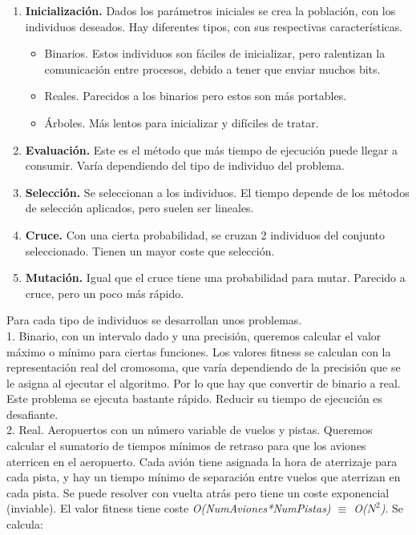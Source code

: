 	\begin{enumerate}
		\item \textbf{Inicialización.} Dados los parámetros iniciales se crea la población, con los individuos deseados. Hay diferentes tipos, con sus respectivas características.
		\begin{itemize}
			\item Binarios. Estos individuos son fáciles de inicializar, pero ralentizan la comunicación entre procesos, debido a tener que enviar muchos bits.
			\item Reales. Parecidos a los binarios pero estos son más portables.
			\item Árboles. Más lentos para inicializar y difíciles de tratar.
		\end{itemize}
		
		\item \textbf{Evaluación.} Este es el método que más tiempo de ejecución puede llegar a consumir. Varía dependiendo del tipo de individuo del problema.
		
		\item \textbf{Selección.} Se seleccionan a los individuos. El tiempo depende de los métodos de selección aplicados, pero suelen ser lineales.
		
		\item \textbf{Cruce.} Con una cierta probabilidad, se cruzan 2 individuos del conjunto seleccionado. Tienen un mayor coste que selección.
		
		\item \textbf{Mutación.} Igual que el cruce tiene una probabilidad para mutar. Parecido a cruce, pero un poco más rápido.
	\end{enumerate}
	
	Para cada tipo de individuos se desarrollan unos problemas.\\
	1. Binario, con un intervalo dado y una precisión, queremos calcular el valor máximo o mínimo para ciertas funciones. Los valores fitness se calculan con la representación real del cromosoma, que varía dependiendo de la precisión que se le asigna al ejecutar el algoritmo. Por lo que hay que convertir de binario a real.
	Este problema se ejecuta bastante rápido. Reducir su tiempo de ejecución es desafiante.\\
	2. Real. Aeropuertos con un número variable de vuelos y pistas. Queremos calcular el sumatorio de tiempos mínimos de retraso para que los aviones aterricen en el aeropuerto. Cada avión tiene asignada la hora de aterrizaje para cada pista, y hay un tiempo mínimo de separación entre vuelos que aterrizan en cada pista. Se puede resolver con vuelta atrás pero tiene un coste exponencial (inviable). El valor fitness tiene coste \textit{O(NumAviones*NumPistas) $\equiv$ O(\(N^{2}\))}. Se calcula:
	
